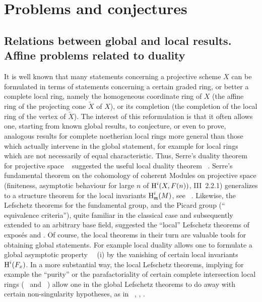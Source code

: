 \chapter{Problems and conjectures} \label{XIII}

\section[Relations between global and local results]
{Relations between global and local results. Affine problems related to duality} \label{XIII.1}

It is well known that many statements concerning a projective scheme
$X$ can be formulated in terms of statements concerning
a certain graded ring, or better a complete local ring,
namely the homogeneous coordinate ring
of $X$ (\ie the affine ring of the projecting cone $\tilde{X}$ of
$X$), or its completion (\ie the completion of the local ring of the vertex
of $\tilde{X}$). The interest of this reformulation is that it
often allows one, starting from known global results, to
conjecture, or even to prove, analogous results for
complete noetherian local rings more general than those which
actually intervene in the global statement, for example for
local rings which are not necessarily of equal
characteristic. Thus, Serre's duality theorem for
projective space ~ suggested the useful
local duality theorem ~.
Serre's fundamental theorem on the cohomology of
coherent Modules on projective space (finiteness,
asymptotic behaviour for large $n$ of $\operatorname{H}^i(X,
F(n))$, {\cf \EGA III~2.2.1}) generalizes to a
structure theorem for the local invariants $\operatorname{H}^i_{\mathfrak{m}}(M)$, see
~. Likewise, the Lefschetz theorems
for the fundamental group, and the Picard group (``
equivalence criteria''), quite familiar in the
classical case and subsequently extended to an arbitrary base field,
suggested the ``local'' Lefschetz theorems of expos\'es
 and . Of course, the local theorems in their
turn are valuable tools for obtaining global statements.
For example local duality allows one to formulate a global
asymptotic property ~~(i) by the vanishing
of certain local invariants $\operatorname{H}^i(F_x)$. In a more
substantial way, the local Lefschetz theorems, implying for
example the ``purity'' or the parafactoriality of certain
complete intersection local rings (~ and
~) allow one in the global Lefschetz
theorems to do away with certain
non-singularity hypotheses, as in ~, ,
.

